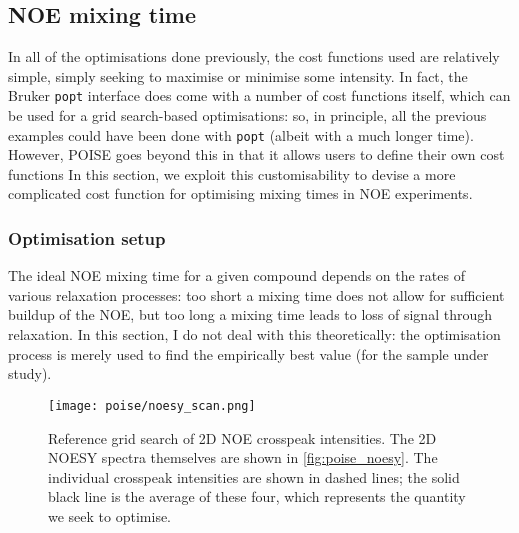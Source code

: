 \subsection{NOE mixing time}
\label{subsec:poise__noe}

In all of the optimisations done previously, the cost functions used are relatively simple, simply seeking to maximise or minimise some intensity.
In fact, the Bruker \texttt{popt} interface does come with a number of cost functions itself, which can be used for a grid search-based optimisations: so, in principle, all the previous examples could have been done with \texttt{popt} (albeit with a much longer time).
However, POISE goes beyond this in that it allows users to define their own cost functions
In this section, we exploit this customisability to devise a more complicated cost function for optimising mixing times in NOE experiments.

\subsubsection{Optimisation setup}

The ideal NOE mixing time for a given compound depends on the rates of various relaxation processes: too short a mixing time does not allow for sufficient buildup of the NOE, but too long a mixing time leads to loss of signal through relaxation.
In this section, I do not deal with this theoretically: the optimisation process is merely used to find the empirically best value (for the sample under study).

\begin{figure}[!ht]
    \centering
    \texttt{[image: poise/noesy\_scan.png]}%
    \caption[Reference grid search of 2D NOE crosspeak intensities]{
        Reference grid search of 2D NOE crosspeak intensities.
        The 2D NOESY spectra themselves are shown in \cref{fig:poise_noesy}.
        The individual crosspeak intensities are shown in dashed lines; the solid black line is the average of these four, which represents the quantity we seek to optimise.
    }
    \label{fig:poise_noesy_scan}
\end{figure}

